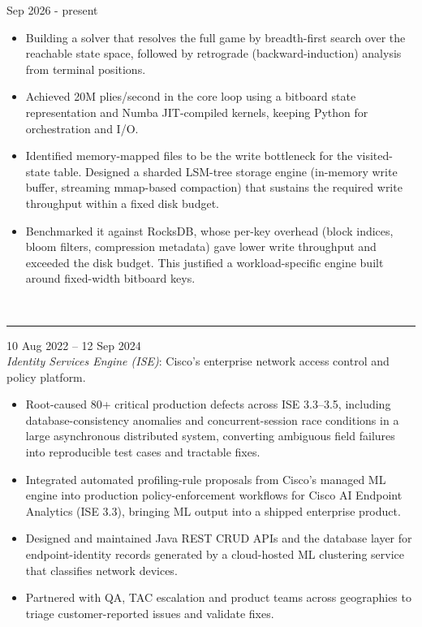\documentclass[9pt]{extarticle}
\begin{document}
{    \vspace{5pt}
     \hfill Sep 2026 - present
    \begin{itemize}[leftmargin=*]
        \item Building a solver that resolves the full game by breadth-first search over the reachable state space, followed by retrograde (backward-induction) analysis from terminal positions.
        \item Achieved 20M plies/second in the core loop using a bitboard state representation and Numba JIT-compiled kernels, keeping Python for orchestration and I/O.
        \item Identified memory-mapped files to be the write bottleneck for the visited-state table. Designed a sharded LSM-tree storage engine (in-memory write buffer, streaming mmap-based compaction) that sustains the required write throughput within a fixed disk budget.
        \item Benchmarked it against RocksDB, whose per-key overhead (block indices, bloom filters, compression metadata) gave lower write throughput and exceeded the disk budget. This justified a workload-specific engine built around fixed-width bitboard keys.
    \end{itemize}

    \vspace{10pt}
     \\
    \vspace{-7pt}
    \hrule
    \vspace{5pt}
     \hfill 10 Aug 2022 -- 12 Sep 2024 \\
    \textit{Identity Services Engine (ISE)}: Cisco's enterprise network access control and policy platform.
    \begin{itemize}[leftmargin=*]
        \item Root-caused 80+ critical production defects across ISE 3.3–3.5, including database-consistency anomalies and concurrent-session race conditions in a large asynchronous distributed system, converting ambiguous field failures into reproducible test cases and tractable fixes.
        \item Integrated automated profiling-rule proposals from Cisco's managed ML engine into production policy-enforcement workflows for Cisco AI Endpoint Analytics (ISE 3.3), bringing ML output into a shipped enterprise product.
        \item Designed and maintained Java REST CRUD APIs and the database layer for endpoint-identity records generated by a cloud-hosted ML clustering service that classifies network devices.
        \item Partnered with QA, TAC escalation and product teams across geographies to triage customer-reported issues and validate fixes.
    \end{itemize}

}
\end{document}
